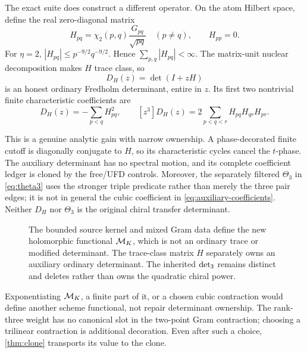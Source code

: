 The exact suite does construct a different operator.  On the atom Hilbert
space, define the real zero-diagonal matrix
\begin{equation}
 H_{pq}=\chi_2(p,q)\frac{G_{pq}}{\sqrt{pq}}\quad(p\ne q),
 \qquad H_{pp}=0.
 \label{eq:auxiliary-H}
\end{equation}
For \(\eta=2\),
\(
 |H_{pq}|\le p^{-9/2}q^{-9/2}
\).  Hence \(\sum_{p,q}|H_{pq}|<\infty\).  The matrix-unit nuclear
decomposition makes \(H\) trace class, so
\begin{equation}
 D_H(z)=\det(I+zH)
 \label{eq:auxiliary-det}
\end{equation}
is an honest ordinary Fredholm determinant, entire in \(z\).  Its first two
nontrivial finite characteristic coefficients are
\begin{equation}
 [z^2]D_H(z)=-\sum_{p<q}H_{pq}^2,
 \qquad
 [z^3]D_H(z)=2\sum_{p<q<r}H_{pq}H_{qr}H_{pr}.
 \label{eq:auxiliary-coefficients}
\end{equation}

This is a genuine analytic gain with narrow ownership.  A phase-decorated
finite cutoff is diagonally conjugate to \(H\), so its characteristic cycles
cancel the \(t\)-phase.  The auxiliary determinant has no spectral motion,
and its complete coefficient ledger is cloned by the free/UFD controls.
Moreover, the separately filtered \(\Theta_3\) in \eqref{eq:theta3} uses the
stronger triple predicate rather than merely the three pair edges; it is not
in general the cubic coefficient in \eqref{eq:auxiliary-coefficients}.
Neither \(D_H\) nor \(\Theta_3\) is the original chiral transfer determinant.

\begin{figure}[t]
\centering

\caption{The bounded source kernel and mixed Gram data define the new
holomorphic functional \(\mathcal M_K\), which is not an ordinary trace or modified
determinant.  The trace-class matrix \(H\) separately owns an auxiliary
ordinary determinant.  The inherited \(\det_{3}\) remains distinct and
deletes rather than owns the quadratic chiral power.}
\label{fig:functional-ownership}
\end{figure}

Exponentiating \(\mathcal M_K\), a finite part of it, or a chosen cubic contraction
would define another scheme functional, not repair determinant ownership.
The rank-three weight has no canonical slot in the two-point Gram
contraction; choosing a trilinear contraction is additional decoration.
Even after such a choice, \cref{thm:clone} transports its value to the clone.
